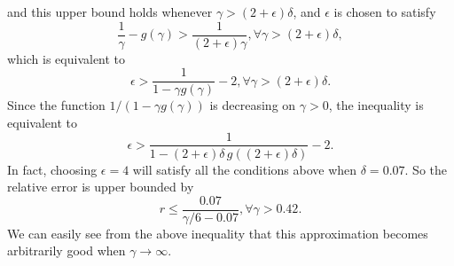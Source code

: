 \documentclass[12pt,draftclsnofoot,journal,onecolumn]{IEEEtran}
\theoremstyle{nonumberplain}
\begin{document}
    and this upper bound holds whenever $\gamma > (2+\epsilon)\delta$, and $\epsilon$ is chosen to satisfy 
    \begin{equation}
        \frac{1}{\gamma} - g(\gamma) > \frac{1}{(2+\epsilon)\gamma}, \forall \gamma > (2+\epsilon)\delta,
    \end{equation}
    which is equivalent to 
    \begin{equation}
        \epsilon > \frac{1}{1-\gamma g(\gamma)}-2, \forall \gamma > (2+\epsilon)\delta.
    \end{equation}
    Since the function $ 1/(1-\gamma g(\gamma))$ is decreasing on $\gamma>0$, the inequality is equivalent to 
    \begin{equation}
        \epsilon > \frac{1}{1-(2+\epsilon)\delta\, g((2+\epsilon)\delta)}-2.
    \end{equation}
    In fact, choosing $\epsilon=4$ will satisfy all the conditions above when $\delta = 0.07$. So the relative error is upper bounded by 
    \begin{equation}
        r \leq \frac{0.07}{\gamma/6 - 0.07}, \forall \gamma > 0.42.
    \end{equation}
    We can easily see from the above inequality that this approximation becomes arbitrarily good when $\gamma\to\infty$.

\footnotesize
\balance 


\end{document}
